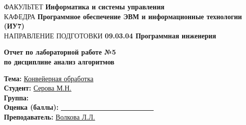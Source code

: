 \begin{titlepage}
	{\doublespacing \small \raggedright ФАКУЛЬТЕТ \hspace{2mm} \textbf{Информатика и системы управления}\\
		КАФЕДРА \hspace{2mm} \textbf{Программное обеспечение ЭВМ и информационные технологии (ИУ7)}\\
		НАПРАВЛЕНИЕ ПОДГОТОВКИ \hspace{2mm} \textbf{09.03.04 Программная инженерия}\\}
	
	
	\vspace{30mm}
	
	\begin{center}
			\centering
			\Large\textbf{  Отчет по лабораторной работе №5}\\
			\textbf{по дисциплине анализ алгоритмов}\\
	\end{center}
	\vspace{20mm}

	
	{\doublespacing\raggedright
		\textbf{Тема:} \hspace{27mm}\underline{Конвейерная обработка}\\
		\textbf{Студент:} \hspace{17mm} \underline{Серова М.Н.}\\
		\textbf{Группа:} \hspace{21mm}\underline{}\\
		\textbf{Оценка (баллы):} \underline{~~~~~~~~~~~~~~~~~~~~~~~~~~~}\\
	\textbf{Преподаватель:} \hspace{2mm}\underline{Волкова Л.Л.}\\}
	


\end{titlepage}
